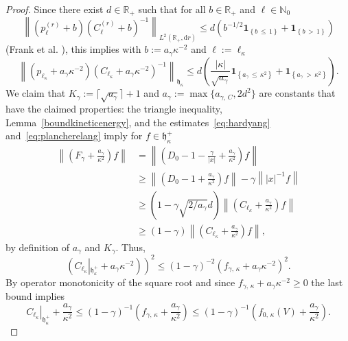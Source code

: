 \documentclass[AHL,Unicode,longabstracts,published]{cedram}
\newcommand*\dr{\mathrm{d}r}
\newcommand*\nz{\mathbb{N}}
\newcommand*\rz{\mathbb{R}}
\newcommand{\one}{\mathbf{1}}
\newcommand*\gh{\mathfrak{h}}
\newcommand*\ghpk{{\gh^+_\kappa}}
\begin{document}
\begin{proof}
Since there exist $d\in\rz_+$ such that for all $b\in\rz_+$ and $\ell\in\nz_0$
\[
\left\|\left(p_\ell^{(r)}+b\right)\left(C_\ell^{(r)}+b\right)^{-1}\right\|_{L^2\left(\rz_+,\dr\right)}
\leq d\left(b^{-1/2}\one_{\left\{b\,\leq\,1\right\}} + \one_{\left\{b\,>\,1\right\}}\right)
\]
(Frank et al. \cite[Formula~(5.7)]{Franketal2020P}), this implies with $b:=a_\gamma\kappa^{-2}$ and $\ell:=\ell_\kappa$
\begin{equation}\label{eq:plancherelang}
\left\|\left(p_{\ell_\kappa}+a_\gamma \kappa^{-2}\right)\left(C_{\ell_\kappa}+a_\gamma
\kappa^{-2}\right)^{-1}\right\|_{\gh_{\kappa}} \leq d\left(\frac{|\kappa|}{\sqrt{a_\gamma}}\one_{\left\{a_\gamma\,\leq\,
\kappa^2\right\}} + \one_{\left\{a_\gamma\,>\,\kappa^2\right\}}\right).
\end{equation}
We claim that $K_\gamma:=\lceil \sqrt{a_\gamma}\rceil+1$ and $a_\gamma:=\max\{a_{\gamma,\,C},2d^2\}$ are constants that have the claimed properties: the triangle inequality, Lemma~\ref{boundkineticenergy}, and the estimates~\eqref{eq:hardyang} and~\eqref{eq:plancherelang} imply for $f\in\ghpk$
\begin{equation}\label{eq:dcc}
\begin{split}
\left\|\left(F_\gamma+\frac{a_\gamma}{\kappa^2}\right)f\right\| &=
\left\|\left(D_0-1-\frac\gamma{|x|}+\frac{a_\gamma}{\kappa^2}\right)f\right\|\\
&\geq \left\|\left(D_0-1+\frac{a_\gamma}{\kappa^2}\right)f\right\|-\gamma\left\||x|^{-1}f\right\|\\
&\geq \left(1-\gamma\sqrt{2/a_\gamma}d\right)
\left\|\left(C_{\ell_\kappa}+\frac{a_\gamma}{\kappa^2}\right)f\right\|\\
&\geq (1-\gamma)
\left\|\left(C_{\ell_\kappa}+\frac{a_\gamma}{\kappa^2}\right) f\right\|,
\end{split}
\end{equation}
by definition of $a_\gamma$ and $K_\gamma$. Thus,
\[
\left(C_{\ell_\kappa}\left|_\ghpk+a_\gamma \kappa^{-2}\right)\right)^2
\leq (1-\gamma)^{-2}\left(f_{\gamma,\,\kappa}+a_\gamma \kappa^{-2}\right)^2.
\]
By operator monotonicity of the square root and since $f_{\gamma,\,\kappa}+a_\gamma \kappa^{-2}\geq0$ the last bound implies
\begin{equation}\label{eq:boundChandraDirac}
\left.C_{\ell_\kappa}\right|_\ghpk+\frac{a_\gamma}{\kappa^2}\leq (1-\gamma)^{-1}\left(f_{\gamma,\,\kappa}+\frac{a_\gamma}{\kappa^2}\right)\leq (1-\gamma)^{-1}\left(f_{0,\,\kappa}(V)+\frac{a_\gamma}{\kappa^2}\right).
\end{equation}

\end{proof}
\end{document}

